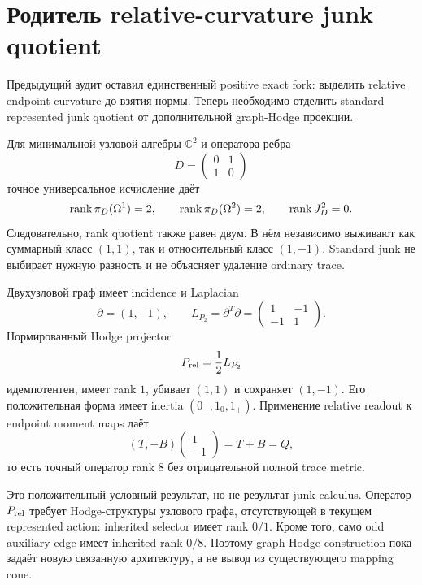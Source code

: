 \chapter{Родитель relative-curvature junk quotient}
\label{ch:v10-h15-r2-relative-curvature-junk-quotient-parent}

Предыдущий аудит оставил единственный positive exact fork: выделить
relative endpoint curvature до взятия нормы. Теперь необходимо отделить
standard represented junk quotient от дополнительной graph-Hodge проекции.

Для минимальной узловой алгебры $\mathbb C^2$ и оператора ребра
\begin{equation}
 D=\begin{pmatrix}0&1\\1&0\end{pmatrix}
\end{equation}
точное универсальное исчисление даёт
\begin{equation}
 \operatorname{rank}\pi_D(\Omega^1)=2,
 \qquad \operatorname{rank}\pi_D(\Omega^2)=2,
 \qquad \operatorname{rank} J_D^2=0.
\end{equation}
Следовательно, rank quotient также равен двум. В нём независимо выживают
как суммарный класс $(1,1)$, так и относительный класс $(1,-1)$. Standard
junk не выбирает нужную разность и не объясняет удаление ordinary trace.

Двухузловой граф имеет incidence и Laplacian
\begin{equation}
 \partial=(1,-1),
 \qquad L_{P_2}=\partial^T\partial=
 \begin{pmatrix}1&-1\\-1&1\end{pmatrix}.
\end{equation}
Нормированный Hodge projector
\begin{equation}
 P_{\rm rel}=\frac12L_{P_2}
\end{equation}
идемпотентен, имеет rank $1$, убивает $(1,1)$ и сохраняет $(1,-1)$.
Его положительная форма имеет inertia $(0_-,1_0,1_+)$. Применение
relative readout к endpoint moment maps даёт
\begin{equation}
 (T,-B)\begin{pmatrix}1\\-1\end{pmatrix}=T+B=Q,
\end{equation}
то есть точный оператор rank $8$ без отрицательной полной trace metric.

Это положительный условный результат, но не результат junk calculus.
Оператор $P_{\rm rel}$ требует Hodge-структуры узлового графа, отсутствующей
в текущем represented action: inherited selector имеет rank $0/1$.
Кроме того, само odd auxiliary edge имеет inherited rank $0/8$. Поэтому
graph-Hodge construction пока задаёт новую связанную архитектуру, а не
вывод из существующего mapping cone.

